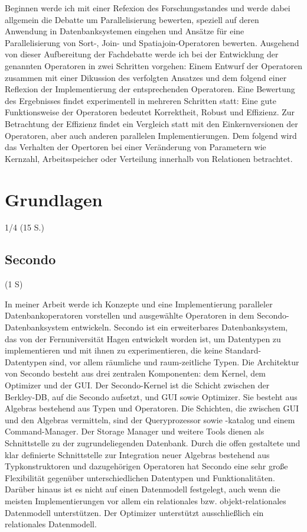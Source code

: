 \documentclass[a4paper,12pt,twoside]{article}
\begin{document}
Beginnen werde ich mit einer Refexion des Forschungsstandes und werde dabei allgemein die Debatte um Parallelisierung bewerten, speziell auf deren Anwendung in Datenbanksystemen eingehen und Ansätze für eine Parallelisierung von Sort-, Join- und Spatiajoin-Operatoren bewerten. Ausgehend von dieser Aufbereitung der Fachdebatte werde ich bei der Entwicklung der genannten Operatoren in zwei Schritten vorgehen: Einem Entwurf der Operatoren zusammen mit einer Dikussion des verfolgten Ansatzes und dem folgend einer Reflexion der Implementierung der entsprechenden Operatoren. Eine Bewertung des Ergebnisses findet experimentell in mehreren Schritten statt: Eine gute Funktionsweise der Operatoren bedeutet Korrektheit, Robust und Effizienz. Zur Betrachtung der Effizienz findet ein Vergleich statt mit den Einkernversionen der Operatoren, aber auch anderen parallelen Implementierungen. Dem folgend wird das Verhalten der Opertoren bei einer Veränderung von Parametern wie Kernzahl, Arbeitsspeicher oder Verteilung innerhalb von Relationen betrachtet.



\section{Grundlagen}
1/4 (15 S.)

\subsection{Secondo} (1 S)

In meiner Arbeit werde ich Konzepte und eine Implementierung paralleler Datenbankoperatoren vorstellen und ausgewählte Operatoren in dem Secondo-Datenbanksystem entwickeln. Secondo {\autocite{Gueting2010}} ist ein erweiterbares Datenbanksystem, das von der Fernuniversität Hagen entwickelt worden ist, um Datentypen zu implementieren und mit ihnen zu experimentieren, die keine Standard-Datentypen sind, vor allem räumliche und raum-zeitliche Typen. Die Architektur von Secondo besteht aus drei zentralen Komponenten: dem Kernel, dem Optimizer und der GUI. Der Secondo-Kernel ist die Schicht zwischen der Berkley-DB, auf die Secondo aufsetzt, und GUI sowie Optimizer. Sie besteht aus Algebras bestehend aus Typen und Operatoren. Die Schichten, die zwischen GUI und den Algebras vermitteln, sind der Queryprozessor sowie -katalog und einem Command-Manager. Der Storage Manager und weitere Tools dienen als Schnittstelle zu der zugrundeliegenden Datenbank. Durch die offen gestaltete und klar definierte Schnittstelle zur Integration neuer Algebras bestehend aus Typkonstruktoren und dazugehörigen Operatoren hat Secondo eine sehr große Flexibilität gegenüber unterschiedlichen Datentypen und Funktionalitäten. Darüber hinaus ist es nicht auf einen Datenmodell festgelegt, auch wenn die meisten Implementierungen vor allem ein relationales bzw. objekt-relationales Datenmodell unterstützen. Der Optimizer unterstützt ausschließlich ein relationales Datenmodell. 
\end{document}
